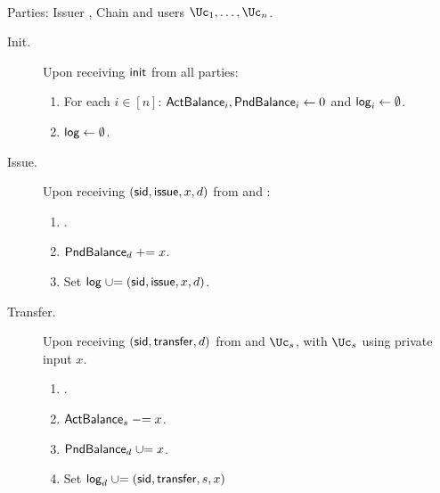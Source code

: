 \begin{functionality}\label{func:ConfidentialTransactions}~
	
	\item[Parties:]	Issuer \Ic, Chain \Cc and users  $\Uc_1, \ldots,\Uc_n$.
	
	\begin{description}
		\item[Init.] Upon receiving $\mathsf{init}$ from  all parties: 
		\begin{enumerate}
			\item  For each $i\in [n]$:  $\mathsf{ActBalance}_i,\mathsf{PndBalance}_i \leftarrow 0$ and  $\mathsf{log}_i \leftarrow \emptyset$.
			
			\item  $\mathsf{log} \leftarrow \emptyset$.
		\end{enumerate}
		
			\item[Issue.]   Upon receiving $(\mathsf{sid},\mathsf{issue},x,d)$ from  \Cc and \Ic:
		\begin{enumerate}
			
			
			\item {}.
			
			\item $\mathsf{PndBalance}_d \mathrel{+}= x$.
			
			\item Set $\mathsf{log} \mathrel{\cup}= {(\mathsf{sid},\mathsf{issue},x,d)}$.
		\end{enumerate}
		
		
		\item[Transfer.]    Upon receiving  $(\mathsf{sid},\mathsf{transfer},d)$ from  \Cc and  $\Uc_s$, with  $\Uc_s$ using private input $x$. 
		
	
		\begin{enumerate}
			\item {}.
			
			\item $\mathsf{ActBalance}_s \mathrel{-}= x$.
			
			\item   $\mathsf{PndBalance}_d \mathrel{\cup}= x$.
			
			\item Set $\mathsf{log}_d \mathrel{\cup}= {(\mathsf{sid},\mathsf{transfer},s,x)}$
			

\end{enumerate}
\end{description}
\end{functionality}

